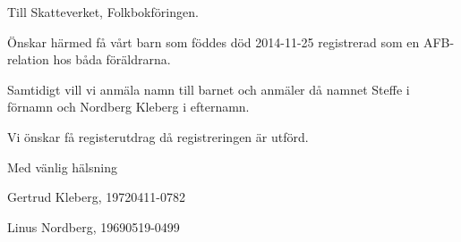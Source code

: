 \documentclass[a4paper]{letter}
\begin{document}
\begin{letter}{Till Skatteverket, Folkbokföringen}.
\address{Linus Nordberg \\ Tegelbruksvägen 42 \\ 126 34 HÄGERSTEN}

\opening{}

Önskar härmed få vårt barn som föddes död 2014-11-25 registrerad som
en AFB-relation hos båda föräldrarna.

Samtidigt vill vi anmäla namn till barnet och anmäler då namnet Steffe
i förnamn och Nordberg Kleberg i efternamn.

Vi önskar få registerutdrag då registreringen är utförd.

Med vänlig hälsning

\bigskip
\bigskip
\bigskip
\bigskip
\bigskip
\bigskip
Gertrud Kleberg, 19720411-0782

\bigskip
\bigskip
\bigskip
\bigskip
\bigskip
\bigskip
Linus Nordberg, 19690519-0499


\end{letter}
\end{document}

